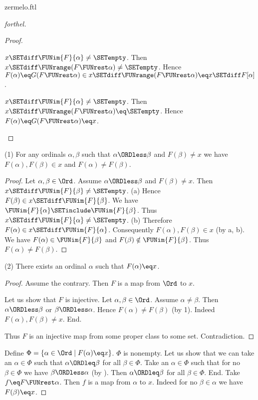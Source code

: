 \documentclass{naproche-library}
\begin{document}
\begin{smodule}[title=Zermelo's Well-Ordering Theorem]{zermelo.ftl}
\begin{proof}[forthel]
\begin{proof}
    \begin{case}{$x \SETdiff \FUNim{F}{\alpha} \neq \SETempty$.}
      Then $x \SETdiff \FUNrange(F \FUNrest \alpha) \neq \SETempty$.
      Hence $F(\alpha)
        \eq G(F \FUNrest \alpha)
        \in x \SETdiff \FUNrange(F \FUNrest \alpha)
        \eq x \SETdiff F[\alpha]$.
    \end{case}

    \begin{case}{$x \SETdiff \FUNim{F}{\alpha} \neq \SETempty$.}
      Then $x \SETdiff \FUNrange(F \FUNrest \alpha) \eq \SETempty$.
      Hence $F(\alpha)
        \eq G(F \FUNrest \alpha)
        \eq x$.
    \end{case}
  \end{proof}

  (1) For any ordinals $\alpha, \beta$ such that $\alpha \ORDless \beta$ and $F(\beta) \neq x$ we have $F(\alpha), F(\beta) \in x$ and $F(\alpha) \neq F(\beta)$.
  \begin{proof}
    Let $\alpha, \beta \in \Ord$.
    Assume $\alpha \ORDless \beta$ and $F(\beta) \neq x$.
    Then $x \SETdiff \FUNim{F}{\beta} \neq \SETempty$.
    (a) Hence $F(\beta) \in x \SETdiff \FUNim{F}{\beta}$.
    We have $\FUNim{F}{\alpha} \SETinclude \FUNim{F}{\beta}$.
    Thus $x \SETdiff \FUNim{F}{\alpha} \neq \SETempty$.
    (b) Therefore $F(\alpha) \in x \SETdiff \FUNim{F}{\alpha}$.
    Consequently $F(\alpha), F(\beta) \in x$ (by a, b).
    We have $F(\alpha) \in \FUNim{F}{\beta}$ and $F(\beta) \notin \FUNim{F}{\beta}$.
    Thus $F(\alpha) \neq F(\beta)$.
  \end{proof}

  (2) There exists an ordinal $\alpha$ such that $F(\alpha) \eq x$.
  \begin{proof}
    Assume the contrary.
    Then $F$ is a map from $\Ord$ to $x$.

    Let us show that $F$ is injective.
      Let $\alpha, \beta \in \Ord$.
      Assume $\alpha \neq \beta$.
      Then $\alpha \ORDless \beta$ or $\beta \ORDless \alpha$.
      Hence $F(\alpha) \neq F(\beta)$ (by 1).
      Indeed $F(\alpha), F(\beta) \neq x$.
    End.

    Thus $F$ is an injective map from some proper class to some set.
    Contradiction.
  \end{proof}

  Define $\Phi = \{ \alpha \in \Ord \mid F(\alpha) \eq x \}$.
  $\Phi$ is nonempty.
  Let us show that we can take an $\alpha \in \Phi$ such that $\alpha \ORDleq \beta$ for all $\beta \in \Phi$.
    Take an $\alpha \in \Phi$ such that for no $\beta \in \Phi$ we have $\beta \ORDless \alpha$ (by ).
    Then $\alpha \ORDleq \beta$ for all $\beta \in \Phi$.
  End.
  Take $f \eq F \FUNrest \alpha$.
  Then $f$ is a map from $\alpha$ to $x$.
  Indeed for no $\beta \in \alpha$ we have $F(\beta) \eq x$.


\end{proof}
\end{smodule}
\end{document}
